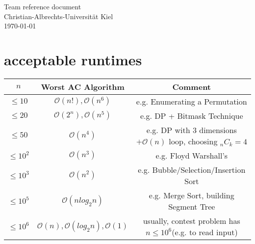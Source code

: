 \documentclass{article}
\newcommand{\lst}[2]{}
\begin{document}
\begin{titlepage}
  \centering
  \large
  \vspace*{\fill}
  \vspace{0.5\baselineskip}
  Team reference document\\
  \vspace{2.5\baselineskip}
  Christian-Albrechts-Universität Kiel \\
  \vspace{2\baselineskip}
  \today \\
  \vspace*{\fill}
\end{titlepage}
      
\begin{multicols*}{2}
  \lst{template}{template.cc}
  
  
  
  
  
    
\end{multicols*}

\section{acceptable runtimes}
\begin{table*}[h]
	\centering
	\begin{tabular}[t]{c c c}
		\hline
		$n$ & Worst AC Algorithm & Comment\\ [0.5ex]
		\hline
		\hline
		$\leq 10$ & $\mathcal{O}(n!), \mathcal{O}(n^6)$ & e.g. Enumerating a Permutation\\
		\hline
		$\leq 20$ & $\mathcal{O}(2^n), \mathcal{O}(n^5)$ & e.g. DP + Bitmask Technique\\
		\hline
		$\leq 50$ & $\mathcal{O}(n^4)$ & e.g. DP with $3$ dimensions $+\mathcal{O}(n)$ loop, choosing $_nC_k=4$\\
		\hline
		$\leq 10^2$ & $\mathcal{O}(n^3)$ & e.g. Floyd Warshall’s\\
		\hline
		$\leq 10^3$ & $\mathcal{O}(n^2)$ & e.g. Bubble/Selection/Insertion Sort\\
		\hline
		$\leq 10^5$ & $\mathcal{O}(n log_2 n)$ & e.g. Merge Sort, building Segment Tree\\
		\hline
		$\leq 10^6$ & $\mathcal{O}(n),\mathcal{O}(log_2n),\mathcal{O}(1)$ & usually, contest problem has $n\leq 10^6$(e.g. to read input)\\
		\hline
	\end{tabular}
\end{table*}
\end{document}
